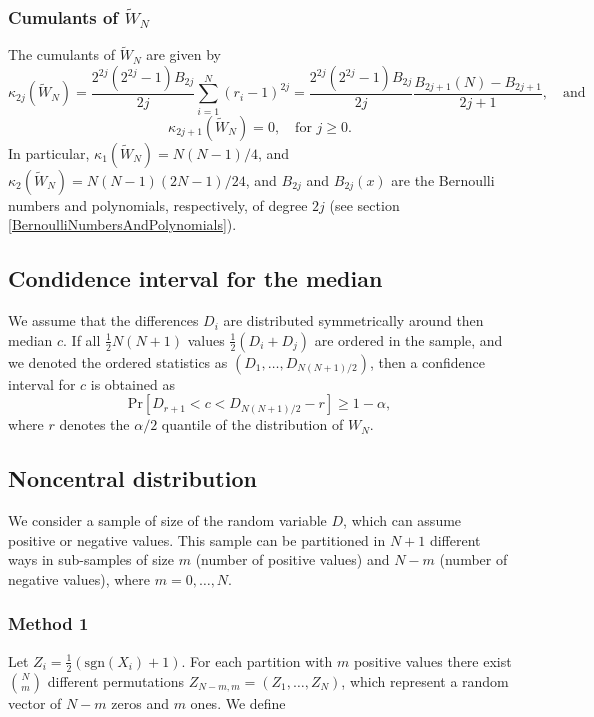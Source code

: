 \subsubsection{Cumulants of $\widetilde{W}_N$}
The cumulants of $\widetilde{W}_N$ are given by
\begin{equation} 
	\kappa_{2j}(\widetilde{W}_N) = \frac{2^{2j} (2^{2j}-1) B_{2j}}{2j} \sum_{i=1}^N (r_i-1)^{2j} = \frac{2^{2j} (2^{2j}-1) B_{2j}}{2j} \frac{B_{2j+1}(N)-B_{2j+1}}{2j+1}, \quad \text{and}
\end{equation}
\begin{equation} 
	\kappa_{2j+1}(\widetilde{W}_N) = 0, \quad \text{for } j \geq 0.
\end{equation}
In particular, $\kappa_1(\widetilde{W}_N)=N(N-1)/4$, and $\kappa_2(\widetilde{W}_N)=N(N-1)(2N-1)/24$, and $B_{2j}$ and  $B_{2j}(x)$ are the Bernoulli numbers and polynomials, respectively, of degree $2j$ (see section \ref{BernoulliNumbersAndPolynomials}).


\subsection{Condidence interval for the median}
We assume that the differences $D_i$ are distributed symmetrically around then median $c$. If all $\tfrac{1}{2} N(N+1)$ values $\tfrac{1}{2}(D_i + D_j)$ are ordered in the sample, and we denoted the ordered statistics as $\left(D_1,\ldots,D_{N(N+1)/2}\right)$, then a confidence interval for $c$ is obtained as 
\begin{equation} 
	\text{Pr} \left[D_{r+1} < c < D_{N(N+1)/2}-r \right] \geq 1-\alpha, 
\end{equation}
where $r$ denotes the $\alpha/2$ quantile of the distribution of $W_N$.





\subsection{Noncentral distribution}
We consider a sample of size of the random variable $D$, which can assume positive or negative values. This sample can be partitioned in $N+1$ different ways in sub-samples of size $m$ (number of positive values) and $N-m$ (number of negative values), where $m=0,\ldots,N$.

\subsubsection{Method 1}
Let $Z_i=\tfrac{1}{2}(\text{sgn}(X_i)+1)$. For each partition with $m$ positive values there exist $\binom {N} {m}$ different permutations $Z_{N-m, m}=(Z_1,\ldots,Z_N)$, which represent a random vector of $N-m$ zeros and $m$ ones. We define

